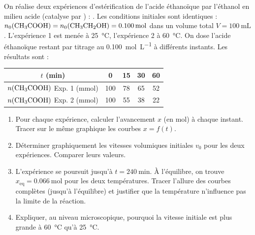 \documentclass[11pt]{article}
\begin{document}
\begin{exercice}
On réalise deux expériences d'estérification de l'acide éthanoïque par l'éthanol en milieu acide (catalyse par ) :
.
Les conditions initiales sont identiques : $n_0(\ce{CH3COOH}) = n_0(\ce{CH3CH2OH}) = \SI{0,100}{\mol}$ dans un volume total $V = \SI{100}{\milli\liter}$.
L'expérience 1 est menée à \SI{25}{\celsius}, l'expérience 2 à \SI{60}{\celsius}. On dose l'acide éthanoïque restant par titrage au  \SI{0,100}{\mol\per\liter} à différents instants. Les résultats sont :

\begin{center}
\begin{tabular}{c|cccc}
$t$ (\si{\minute}) & 0 & 15 & 30 & 60 \\
\hline
$n(\ce{CH3COOH})$ Exp. 1 (\si{\milli\mol}) & 100 & 78 & 65 & 52 \\
$n(\ce{CH3COOH})$ Exp. 2 (\si{\milli\mol}) & 100 & 55 & 38 & 22 \\
\end{tabular}
\end{center}
\begin{enumerate}
\item Pour chaque expérience, calculer l'avancement $x$ (en \si{\mol}) à chaque instant. Tracer sur le même graphique les courbes $x = f(t)$.
\item Déterminer graphiquement les vitesses volumiques initiales $v_0$ pour les deux expériences. Comparer leurs valeurs.
\item L'expérience se poursuit jusqu'à $t = \SI{240}{\minute}$. À l'équilibre, on trouve $x_{\text{eq}} = \SI{0,066}{\mol}$ pour les deux températures. Tracer l'allure des courbes complètes (jusqu'à l'équilibre) et justifier que la température n'influence pas la limite de la réaction.
\item Expliquer, au niveau microscopique, pourquoi la vitesse initiale est plus grande à \SI{60}{\celsius} qu'à \SI{25}{\celsius}.
\end{enumerate}
\end{exercice}
\end{document}
